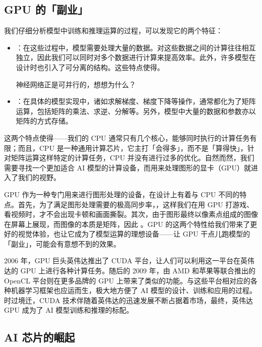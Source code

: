\subsection{GPU 的「副业」}

我们仔细分析模型中训练和推理运算的过程，可以发现它的两个特征：

\begin{itemize}
  \item {}：在这些过程中，模型需要处理大量的数据。对这些数据之间的计算往往相互独立，因此我们可以同时对多个数据进行计算来提高效率。此外，许多模型在设计时也引入了可分离的结构。这些特点使得。
    \begin{note}
      神经网络正是可并行的，想想为什么？
    \end{note}
  \item {}：在具体的模型实现中，诸如求解梯度、梯度下降等操作，通常都化为了矩阵运算，包括矩阵的乘法、求逆、分解等。另外，模型中大量的数据和参数亦以矩阵的方式存储。
\end{itemize}

这两个特点使得——我们的 CPU 通常只有几个核心，能够同时执行的计算任务有限；而且，CPU 是一种通用计算芯片，它主打「会得多」，而不是「算得快」，针对矩阵运算这样特定的计算任务，CPU 并没有进行过多的优化。自然而然，我们需要寻找一个更加适合 AI 模型的计算设备，而用来处理图形的显卡（GPU）就进入了我们的视野。

GPU 作为一种专门用来进行图形处理的设备，在设计上有着与 CPU 不同的特点。首先，为了满足图形处理需要的极高同步率，，这样我们在用 GPU 打游戏、看视频时，才不会出现卡顿和画面撕裂。其次，由于图形最终以像素点组成的图像在屏幕上展现，而图像的本质是矩阵，因此 。GPU 的这两个特性给我们带来了更好的视觉体验，也让它成为了模型运算的理想设备——让 GPU 干点儿跑模型的「副业」，可能会有意想不到的效果。

2006 年，GPU 巨头英伟达推出了 CUDA 平台，让人们可以利用这一平台在英伟达的 GPU 上进行各种计算任务。随后的 2009 年，由 AMD 和苹果等联合推出的 OpenCL 平台则在更多品牌的 GPU 上带来了类似的功能。与这些平台相对应的各种机器学习框架也应运而生，极大地方便了 AI 模型的设计、训练和应用的过程。时过境迁，CUDA 技术伴随着英伟达的迅速发展不断占据着市场，最终，英伟达 GPU 成为了 AI 模型训练和推理的标配。

\subsection{AI 芯片的崛起}

